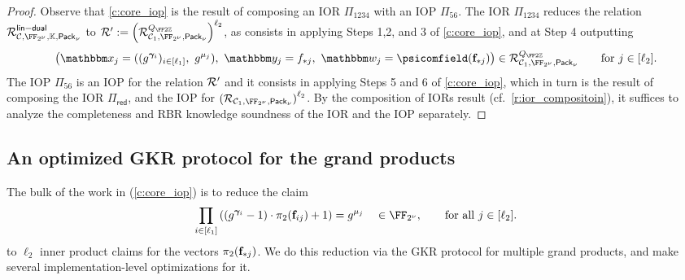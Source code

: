 \documentclass[11pt,letterpaper,usenames,dvipsnames]{article}
\begin{document}
\begin{theorem}\label{t:thm_core_IOPP}
\end{theorem}
\begin{proof}
Observe that \cref{c:core_iop} is the result of composing an IOR $\Pi_{1234}$ with an IOP $\Pi_{56}$. The IOR  $\Pi_{1234}$ reduces the relation $\Relation^{\mathsf{lin-dual}}_{\cC, \comfield, \evalfield, \pack}$ to $\Relation':=\left(\Relation^{Q_{\FF2\ZZ}}_{\cC_1,\comfield,\pack}\right)^{\codedim_2}$, as consists in applying Steps 1,2, and 3 of \cref{c:core_iop}, and at Step 4 outputting 
$$
\left(\inp_j=((g^{\bm{\gamma}_i})_{i \in [\codedim_1]},\ g^{\mu_j}),\  \oracle_j= f_{*j}, \ \wit_j=\psicomfield(\bff_{*j})\right)\in \Relation^{Q_{\FF2\ZZ}}_{\cC_1,\comfield,\pack} \qquad \text{for } j\in [\ell_2].
$$
The IOP $\Pi_{56}$ is an IOP for  the relation $\mathcal{R}'$ and it consists in applying Steps 5 and 6 of \cref{c:core_iop}, which in turn is the result of composing the IOR $\Pi_{\mathsf{red}}$, and the IOP for $\left(\Relation_{\cC_1, \comfield,\pack}\right)^{\codedim_2}$. By the composition of IORs result (cf.\ \cref{r:ior_compositoin}), it suffices to analyze the completeness and RBR knowledge soundness of the IOR and the IOP separately. 


\end{proof}





\subsection{An optimized GKR protocol for the \ftwoz grand products}

The bulk of the work in \ftwoz (\cref{c:core_iop}) is to reduce the claim
\begin{equation}\label{e:main_grand_product}
\prod_{i \in [\codedim_1]} \left(\left(g^{\bm{\gamma}_i}-1\right)\cdot \pi_2(\bff_{ij}) +1\right)= g^{\mu_j}  \quad  \in \comfield, \qquad \text{for all } j\in [\codedim_2].
\end{equation}
to $\ell_2$ inner product claims for the vectors $\pi_2(\mathbf{f}_{*j})$. We do this reduction via the GKR protocol for multiple grand products, and make several implementation-level optimizations for it.  


 
\end{document}
